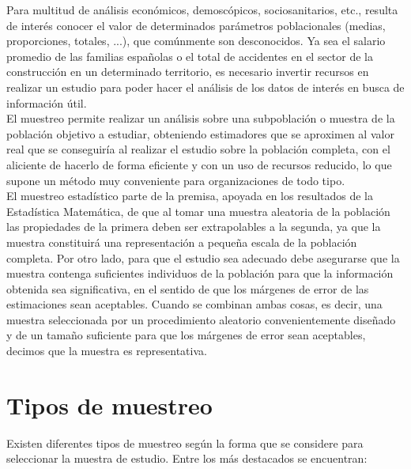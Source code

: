 Para multitud de análisis económicos, demoscópicos, sociosanitarios, etc., resulta de interés conocer el valor de determinados parámetros poblacionales (medias, proporciones, totales, ...), que comúnmente son desconocidos. Ya sea el salario promedio de las familias españolas o el total de accidentes en el sector de la construcción en un determinado territorio, es necesario invertir recursos en realizar un estudio para poder hacer el análisis de los datos de interés en busca de información útil.\\

El muestreo permite realizar un análisis sobre una subpoblación o muestra de la población objetivo a estudiar, obteniendo estimadores que se aproximen al valor real que se conseguiría al realizar el estudio sobre la población completa, con el aliciente de hacerlo de forma eficiente y con un uso de recursos reducido, lo que supone un método muy conveniente para organizaciones de todo tipo.\\

El muestreo estadístico parte de la premisa, apoyada en los resultados de la Estadística Matemática, de que al tomar una muestra aleatoria de la población las propiedades de la primera deben ser extrapolables a la segunda, ya que la muestra constituirá una representación a pequeña escala de la población completa. Por otro lado, para que el estudio sea adecuado debe asegurarse que la muestra contenga suficientes individuos de la población para que la información obtenida sea significativa, en el sentido de que los márgenes de error de las estimaciones sean aceptables. Cuando se combinan ambas cosas, es decir, una muestra seleccionada por un procedimiento aleatorio convenientemente diseñado y de un tamaño suficiente para que los márgenes de error sean aceptables, decimos que la muestra es representativa.\\

\section{Tipos de muestreo}
Existen diferentes tipos de muestreo según la forma que se considere para seleccionar la muestra de estudio. Entre los más destacados se encuentran: \\

